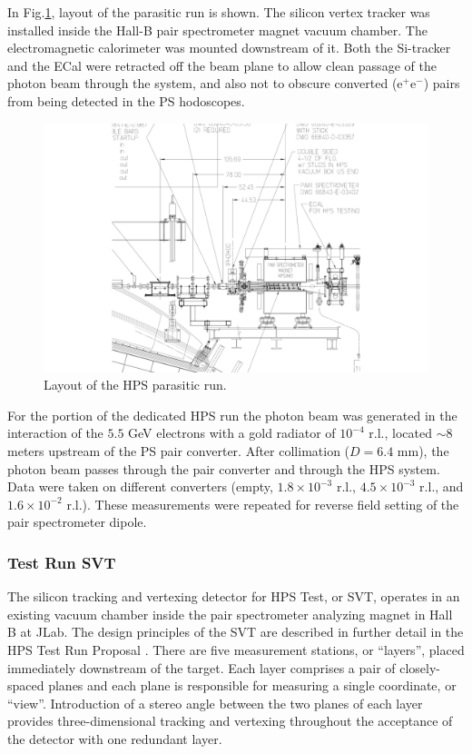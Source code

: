 In Fig.\ref{fig:hpstest}, layout of the parasitic run is shown. The silicon vertex tracker was installed inside the Hall-B pair spectrometer magnet vacuum chamber. The electromagnetic calorimeter was mounted downstream of it.
Both the Si-tracker and the ECal were retracted off the beam plane to allow clean passage of the photon beam through the system, and also not to obscure converted (e$^+$e$^-$) pairs from being detected in the PS hodoscopes.
 
\begin{figure}[ht]
    \includegraphics[width=\textwidth]{test2012/HPS_dimensions}
\caption{\small{Layout of the HPS parasitic run.} }
\label{fig:hpstest}
\end{figure}

For the portion of the dedicated HPS run the photon beam was generated in the interaction of the $5.5$ GeV electrons with a gold radiator of $10^{-4}$ r.l., located $\sim 8$ meters upstream of the PS pair converter. After collimation ($D=6.4$ mm), the photon beam passes through the pair converter and through the HPS system. Data were taken on different converters (empty, $1.8\times 10^{-3}$ r.l., $4.5\times 10^{-3}$ r.l., and $1.6\times 10^{-2}$ r.l.). These measurements were repeated for reverse field setting of the pair spectrometer dipole.


\subsubsection{Test Run SVT}

The silicon tracking and vertexing detector for HPS Test, or SVT, operates in an existing vacuum chamber inside the pair spectrometer analyzing magnet in Hall B at JLab.  The design principles of the SVT are described in further detail in the HPS Test Run Proposal  \cite{HPS_tPROP}. There are five measurement stations, or ``layers'', placed immediately downstream of the target. Each layer comprises a pair of closely-spaced planes and each plane is responsible for measuring a single coordinate, or ``view''. Introduction of a stereo angle between the two planes of each layer provides three-dimensional tracking and vertexing throughout the acceptance of the detector with one redundant layer. 

